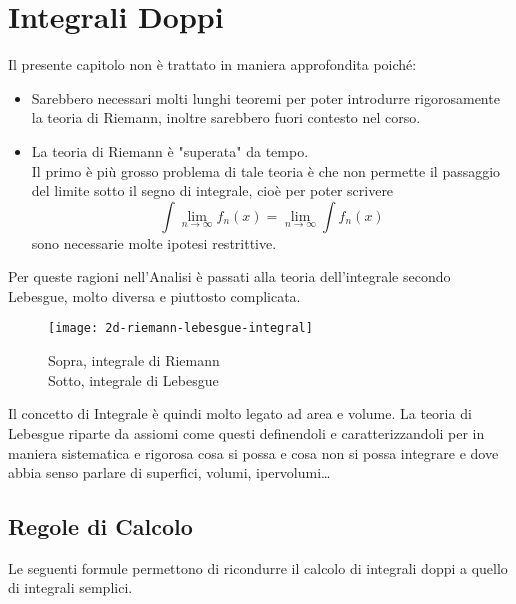 \chapter{Integrali Doppi}\label{chap:int_doppi}
Il presente capitolo non è trattato in maniera approfondita poiché:
\begin{itemize}
	\item Sarebbero necessari molti lunghi teoremi per poter introdurre rigorosamente la teoria di Riemann, inoltre sarebbero fuori contesto nel corso.
	\item La teoria di Riemann è "superata" da tempo.\\
		Il primo è più grosso problema di tale teoria è che non permette il passaggio del limite sotto il segno di integrale, cioè per poter scrivere 
		\[ \int\lim\limits_{n\to\infty}f_n(x) = \lim\limits_{n\to\infty}\int f_n(x)\]
		sono necessarie molte ipotesi restrittive.
\end{itemize}
Per queste ragioni nell'Analisi è passati alla teoria dell'integrale secondo Lebesgue, molto diversa e piuttosto complicata.
\begin{figure}[H]
	\centering
	\texttt{[image: 2d-riemann-lebesgue-integral]}
	\caption{Sopra, integrale di Riemann\\Sotto, integrale di Lebesgue}
\end{figure}

Il concetto di Integrale è quindi molto legato ad area e volume. La teoria di Lebesgue riparte da assiomi come questi definendoli e caratterizzandoli per in maniera sistematica e rigorosa cosa si possa e cosa non si possa integrare e dove abbia senso parlare di superfici, volumi, ipervolumi\dots

\newpage
\section{Regole di Calcolo}
Le seguenti formule permettono di ricondurre il calcolo di integrali doppi a quello di integrali semplici.


